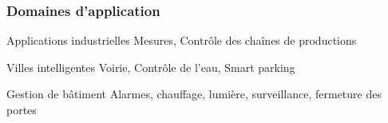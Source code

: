 \begin{frame}\frametitle{Domaines d'application}

    \begin{block}{Applications industrielles}
      Mesures, Contrôle des chaînes de productions
    \end{block}

    \begin{block}{Villes intelligentes}
      Voirie, Contrôle de l'eau, Smart parking
    \end{block}

    \begin{block}{Gestion de bâtiment}
      Alarmes, chauffage, lumière, surveillance, fermeture des portes
    \end{block}



\end{frame}

